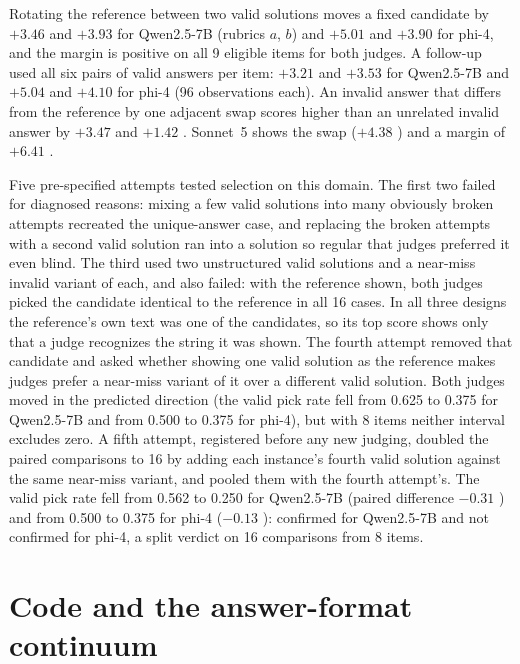 Rotating the reference between two valid solutions moves a fixed candidate by $+3.46$  and $+3.93$  for Qwen2.5-7B (rubrics $a$, $b$) and $+5.01$  and $+3.90$  for phi-4, and the margin is positive on all 9 eligible items for both judges. A follow-up used all six pairs of valid answers per item: $+3.21$  and $+3.53$  for Qwen2.5-7B and $+5.04$  and $+4.10$  for phi-4 (96 observations each). An invalid answer that differs from the reference by one adjacent swap scores higher than an unrelated invalid answer by $+3.47$  and $+1.42$ . Sonnet~5 shows the swap ($+4.38$ ) and a margin of $+6.41$ .

Five pre-specified attempts tested selection on this domain. The first two failed for diagnosed reasons: mixing a few valid solutions into many obviously broken attempts recreated the unique-answer case, and replacing the broken attempts with a second valid solution ran into a solution so regular that judges preferred it even blind. The third used two unstructured valid solutions and a near-miss invalid variant of each, and also failed: with the reference shown, both judges picked the candidate identical to the reference in all 16 cases. In all three designs the reference's own text was one of the candidates, so its top score shows only that a judge recognizes the string it was shown. The fourth attempt removed that candidate and asked whether showing one valid solution as the reference makes judges prefer a near-miss variant of it over a different valid solution. Both judges moved in the predicted direction (the valid pick rate fell from 0.625 to 0.375 for Qwen2.5-7B and from 0.500 to 0.375 for phi-4), but with 8 items neither interval excludes zero. A fifth attempt, registered before any new judging, doubled the paired comparisons to 16 by adding each instance's fourth valid solution against the same near-miss variant, and pooled them with the fourth attempt's. The valid pick rate fell from 0.562 to 0.250 for Qwen2.5-7B (paired difference $-0.31$ ) and from 0.500 to 0.375 for phi-4 ($-0.13$ ): confirmed for Qwen2.5-7B and not confirmed for phi-4, a split verdict on 16 comparisons from 8 items.
\FloatBarrier
\section{Code and the answer-format continuum}
\label{app:code}

